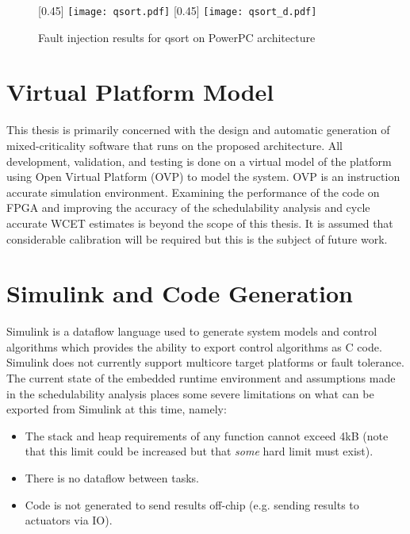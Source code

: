 	
	
\begin{figure}
\captionsetup[subfigure]{singlelinecheck=false}
\centering
{}[0.45\textwidth]
{
    \texttt{[image: qsort.pdf]}
}%
\hfill
{}[0.45\textwidth]
{
    \texttt{[image: qsort\_d.pdf]}
}%
\caption{Fault injection results for qsort on PowerPC architecture}
\label{f:ft-arch}
\end{figure}

\section{Virtual Platform Model}

	This thesis is primarily concerned with the design and automatic generation of mixed-criticality software that runs on the proposed architecture. 
	All development, validation, and testing is done on a virtual model of the platform using Open Virtual Platform (OVP) to model the system. OVP is an instruction accurate simulation environment. 
	Examining the performance of the code on FPGA and improving the accuracy of the schedulability analysis and cycle accurate WCET estimates is beyond the scope of this thesis. 
	It is assumed that considerable calibration will be required but this is the subject of future work.

\section{Simulink and Code Generation}

	Simulink is a dataflow language used to generate system models and control algorithms which provides the ability to export control algorithms as C code. 
	Simulink does not currently support multicore target platforms or fault tolerance. 
	The current state of the embedded runtime environment and assumptions made in the schedulability analysis places some severe limitations on what can be exported from Simulink at this time, namely:
\begin{itemize}
  \item The stack and heap requirements of any function cannot exceed 4kB (note that this limit could be increased but that \emph{some} hard limit must exist).
  \item There is no dataflow between tasks.
  \item Code is not generated to send results off-chip (e.g. sending results to actuators via IO).
\end{itemize}



